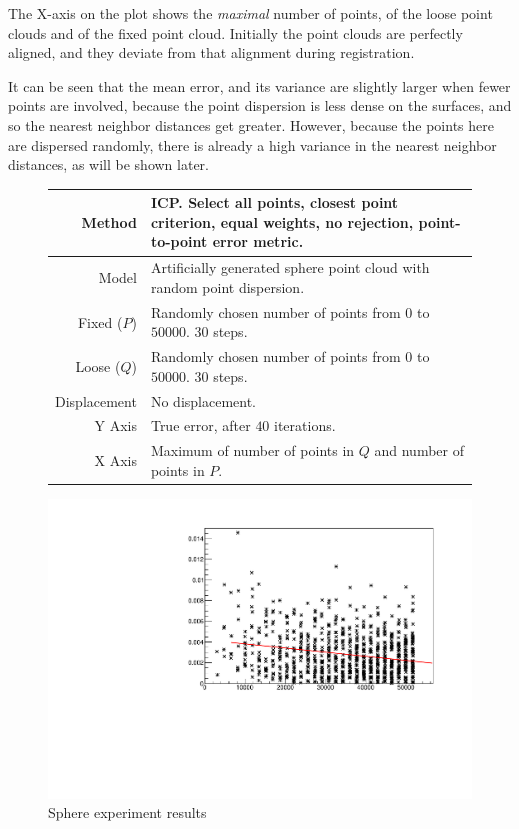 The X-axis on the plot shows the \emph{maximal} number of points, of the loose point clouds and of the fixed point cloud. Initially the point clouds are perfectly aligned, and they deviate from that alignment during  registration.

It can be seen that the mean error, and its variance are slightly larger when fewer points are involved, because the point dispersion is less dense on the surfaces, and so the nearest neighbor distances get greater. However, because the points here are dispersed randomly, there is already a high variance in the nearest neighbor distances, as will be shown later.

\begin{figure}[H]
\begin{tabularx}{\textwidth}{|r|X|} \hline
Method & ICP. Select all points, closest point criterion, equal weights, no rejection, point-to-point error metric. \\ \hline
Model & Artificially generated sphere point cloud with random point dispersion. \\ \hline
Fixed ($P$) & Randomly chosen number of points from $0$ to $50000$. $30$ steps. \\ \hline
Loose ($Q$) & Randomly chosen number of points from $0$ to $50000$. $30$ steps. \\ \hline
Displacement & No displacement. \\ \hline
Y Axis & True error, after $40$ iterations. \\\hline
X Axis & Maximum of number of points in $Q$ and number of points in $P$. \\ \hline
\end{tabularx}
\end{figure}

\begin{figure}[H]
\centering
\includegraphics[width=.7\textwidth]{fig/sphere_icp.pdf}
\caption{Sphere experiment results}
\end{figure}


